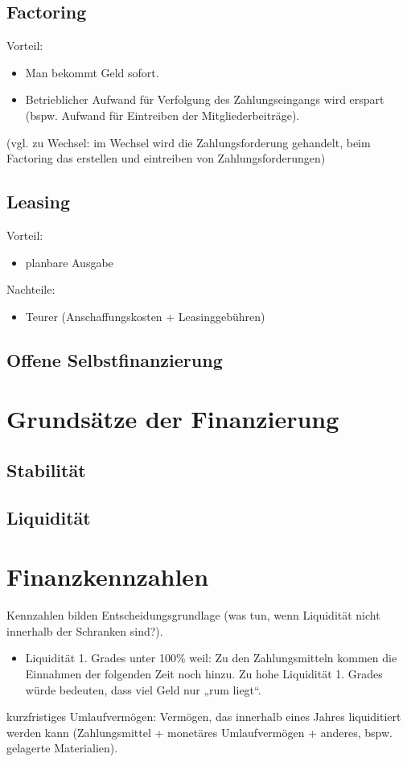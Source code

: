 \documentclass{scrreprt}
\begin{document}
\subsection{Factoring}
Vorteil:
\begin{itemize}
\item Man bekommt Geld sofort.
\item Betrieblicher Aufwand für Verfolgung des Zahlungseingangs wird erspart (bspw. Aufwand für Eintreiben der Mitgliederbeiträge).
\end{itemize}
(vgl. zu Wechsel: im Wechsel wird die Zahlungsforderung gehandelt, beim Factoring das erstellen und eintreiben von Zahlungsforderungen)

\subsection{Leasing}
Vorteil:
\begin{itemize}
\item planbare Ausgabe
\end{itemize}
Nachteile:
\begin{itemize}
\item Teurer (Anschaffungskosten + Leasinggebühren)
\end{itemize}

\subsection{Offene Selbstfinanzierung}

\section{Grundsätze der Finanzierung}
\subsection{Stabilität}
\subsection{Liquidität}

\section{Finanzkennzahlen}
Kennzahlen bilden Entscheidungsgrundlage (was tun, wenn Liquidität nicht innerhalb der Schranken sind?).
\begin{itemize}
\item Liquidität 1. Grades unter 100\% weil: Zu den Zahlungsmitteln kommen die Einnahmen der folgenden Zeit noch hinzu. Zu hohe Liquidität 1. Grades würde bedeuten, dass viel Geld nur „rum liegt“.
\end{itemize}
kurzfristiges Umlaufvermögen: Vermögen, das innerhalb eines Jahres liquiditiert werden kann (Zahlungsmittel + monetäres Umlaufvermögen + anderes, bspw. gelagerte Materialien).
\end{document}
